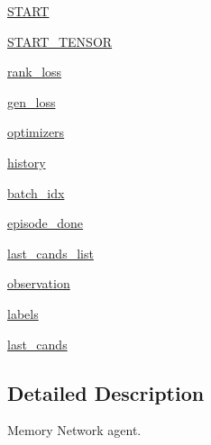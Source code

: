 \begin{DoxyCompactItemize}
\item 
\hyperlink{classparlai_1_1agents_1_1legacy__agents_1_1memnn_1_1memnn__v0_1_1MemnnAgent_ad47aab7437ba9ae08a1cd0637de02f27}{S\+T\+A\+RT}
\item 
\hyperlink{classparlai_1_1agents_1_1legacy__agents_1_1memnn_1_1memnn__v0_1_1MemnnAgent_a7a1ae5fdf464724f1c696ea71f4e2593}{S\+T\+A\+R\+T\+\_\+\+T\+E\+N\+S\+OR}
\item 
\hyperlink{classparlai_1_1agents_1_1legacy__agents_1_1memnn_1_1memnn__v0_1_1MemnnAgent_a438cc6b1bc8e6443220b6d25a332f627}{rank\+\_\+loss}
\item 
\hyperlink{classparlai_1_1agents_1_1legacy__agents_1_1memnn_1_1memnn__v0_1_1MemnnAgent_a1679d276474a4ab8baa4d368fdee8c8b}{gen\+\_\+loss}
\item 
\hyperlink{classparlai_1_1agents_1_1legacy__agents_1_1memnn_1_1memnn__v0_1_1MemnnAgent_a442f9e9a53de9c0e91953371e11a2b5d}{optimizers}
\item 
\hyperlink{classparlai_1_1agents_1_1legacy__agents_1_1memnn_1_1memnn__v0_1_1MemnnAgent_a86ebdb3ff6941cfb15945a9f3f198f83}{history}
\item 
\hyperlink{classparlai_1_1agents_1_1legacy__agents_1_1memnn_1_1memnn__v0_1_1MemnnAgent_a760f59a2f18c3132341cfc6737365c1f}{batch\+\_\+idx}
\item 
\hyperlink{classparlai_1_1agents_1_1legacy__agents_1_1memnn_1_1memnn__v0_1_1MemnnAgent_a19eee67f8834043130a277fa35bbffc5}{episode\+\_\+done}
\item 
\hyperlink{classparlai_1_1agents_1_1legacy__agents_1_1memnn_1_1memnn__v0_1_1MemnnAgent_affeb8168155ac425e348c0ce599f1764}{last\+\_\+cands\+\_\+list}
\item 
\hyperlink{classparlai_1_1agents_1_1legacy__agents_1_1memnn_1_1memnn__v0_1_1MemnnAgent_afa839a741742c292916a7fce23c71a31}{observation}
\item 
\hyperlink{classparlai_1_1agents_1_1legacy__agents_1_1memnn_1_1memnn__v0_1_1MemnnAgent_a5d56f023807667a1e589833d3d5220df}{labels}
\item 
\hyperlink{classparlai_1_1agents_1_1legacy__agents_1_1memnn_1_1memnn__v0_1_1MemnnAgent_a2f76bf7b117ffc19e89b2b6168026063}{last\+\_\+cands}
\end{DoxyCompactItemize}


\subsection{Detailed Description}
\begin{DoxyVerb}Memory Network agent.
\end{DoxyVerb}
 

